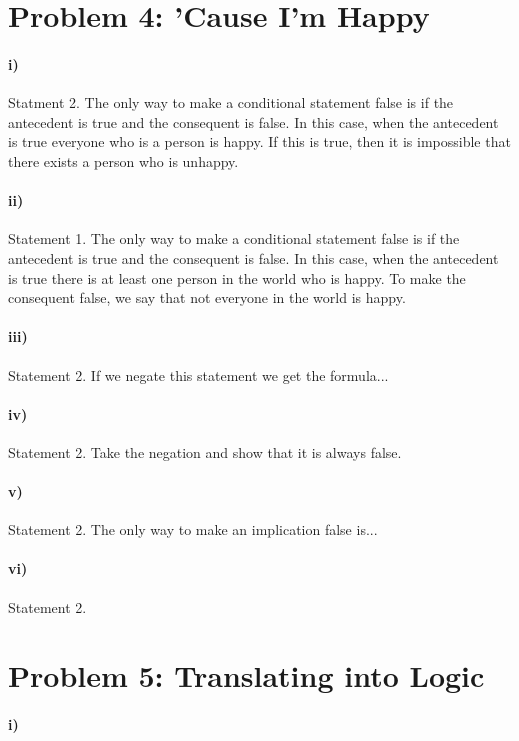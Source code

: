 \documentclass[10pt,letter]{article}
\begin{document}
\section*{Problem 4: 'Cause I'm Happy}

\paragraph{i)} Statment 2. The only way to make a conditional statement false is if the antecedent is true and the consequent is false. In this case, when the antecedent is true everyone who is a person is happy. If this is true, then it is impossible that there exists a person who is unhappy. 

\paragraph{ii)} Statement 1. The only way to make a conditional statement false is if the antecedent is true and the consequent is false. In this case, when the antecedent is true there is at least one person in the world who is happy. To make the consequent false, we say that not everyone in the world is happy. 

\paragraph{iii)} Statement 2. If we negate this statement we get the formula...

\paragraph{iv)} Statement 2. Take the negation and show that it is always false.

\paragraph{v)} Statement 2. The only way to make an implication false is...

\paragraph{vi)} Statement 2.

\section*{Problem 5: Translating into Logic}

\paragraph{i)}
\end{document}
